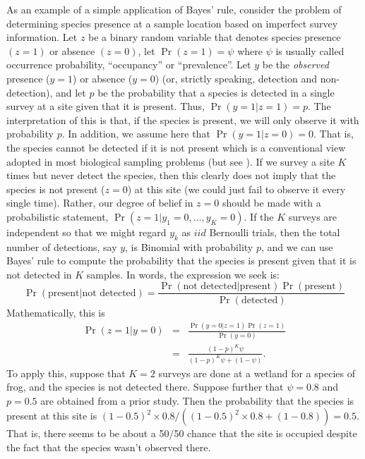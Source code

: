As an example of a simple application of Bayes' rule,
consider the problem of determining species presence at a sample
location based on imperfect survey information. Let $z$ be a binary
random variable that denotes species presence $(z=1)$ or absence
$(z=0)$, let $\Pr(z=1) = \psi$ where $\psi$ is usually called
occurrence probability, ``occupancy'' \citep{mackenzie_etal:2002} or ``prevalence''.
Let $y$ be the {\it observed} presence
($y=1$) or absence ($y=0$) (or, strictly speaking, detection and non-detection), and let $p$ be the probability that a
species is detected in a single survey at a site given that it is
present. Thus, $\Pr(y=1|z=1)=p$. The interpretation of this is that,
if the species is present, we will only observe it with
probability $p$. In addition, we assume here that $\Pr(y=1|z=0) =
0$. That is, the species cannot be detected if it is not present which
is a conventional view adopted in most biological sampling problems (but
see \citet{royle_link:2006}).
If we survey a site $K$ times but never detect the species,
then this clearly does not imply that the species is not present
($z=0$) at this site (we could just fail to observe it every single time). Rather, our degree of belief in $z=0$ should be
made with a probabilistic statement,
$\Pr(z=1|y_1=0,\ldots,y_{K}=0)$. If the $K$ surveys are independent so
that we might regard $y_{k}$ as $iid$ Bernoulli trials, then the total
number of detections, say $y$, is Binomial with probability $p$, and
we can use Bayes' rule to compute the probability that the species is present
given that it is not detected in $K$ samples. In words, the expression
we seek is:
\[
\Pr(\mbox{present} | \mbox{not detected}) = \frac{\Pr(\mbox{not detected} |
  \mbox{present})\Pr(\mbox{present})}{\Pr(\mbox{detected})}
\]
Mathematically, this is
\begin{eqnarray*}
\Pr(z=1|y=0) &= &\frac{\Pr(y=0|z=1)\Pr(z=1)}{\Pr(y=0) } \\
             &= & \frac{(1-p)^{K} \psi}{ (1-p)^K \psi + (1-\psi) }.
\end{eqnarray*}
To apply this,
suppose that $K=2$ surveys are done at a wetland for a species of
frog, and the species is not detected there. Suppose further that $\psi
= 0.8$ and $p = 0.5$ are obtained from a prior study.  Then the
probability that the species is present at this site is
$(1-0.5)^2 \times 0.8/((1-0.5)^2 \times 0.8 + (1-0.8)) = 0.5$. 
That is, there seems to be about a
50/50 chance that the site is occupied despite the fact that the
species wasn't observed there.

